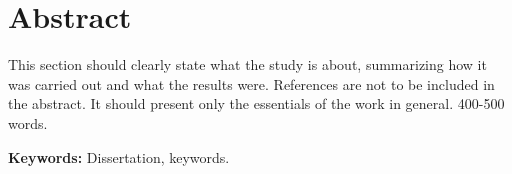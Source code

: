 \newpage

\chapter*{\centering Abstract}

\begin{spacing}{1.5}
\setlength{\parskip}{0.3in}


This section should clearly state what the study is about, summarizing how it was carried out and what the results were. References are not to be included in the abstract. It should present only the essentials of the work in general. 400-500 words.

\par
\textbf{Keywords:} Dissertation, keywords.
\end{spacing}
\newpage
